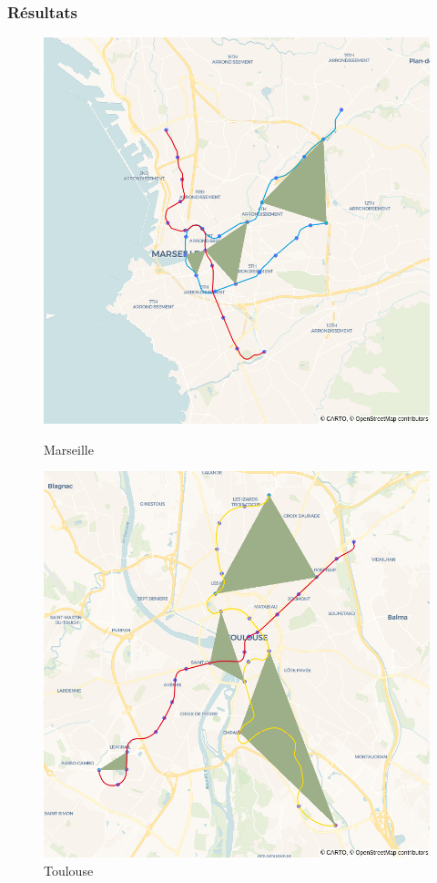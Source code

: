 \documentclass{beamer}
\begin{document}
\begin{frame}
    \frametitle{Résultats}
    \begin{figure}[h]
        \centering
        \begin{minipage}[c]{.42\linewidth}
            \centering
            \includegraphics[width=1.1\textwidth]{../../Code/images/marseille.png}
            \caption{Marseille}
        \end{minipage}
        \hfill
        \begin{minipage}[c]{.42\linewidth}
            \centering
            \includegraphics[width=1.1\textwidth]{../../Code/images/toulouse.png}
            \caption{Toulouse}
        \end{minipage}
    \end{figure}
\end{frame}
\end{document}
